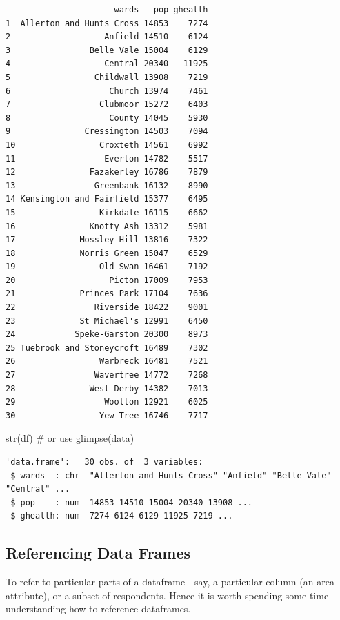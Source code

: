 \documentclass[
  letterpaper,
  DIV=11,
  numbers=noendperiod,
  oneside]{scrreprt}
\newenvironment{Shaded}{\begin{snugshade}}{\end{snugshade}}
\newcommand{\CommentTok}[1]{\textcolor[rgb]{0.37,0.37,0.37}{#1}}
\newcommand{\FunctionTok}[1]{\textcolor[rgb]{0.28,0.35,0.67}{#1}}
\newcommand{\NormalTok}[1]{\textcolor[rgb]{0.00,0.23,0.31}{#1}}
\begin{document}
\begin{verbatim}
                      wards   pop ghealth
1  Allerton and Hunts Cross 14853    7274
2                   Anfield 14510    6124
3                Belle Vale 15004    6129
4                   Central 20340   11925
5                 Childwall 13908    7219
6                    Church 13974    7461
7                  Clubmoor 15272    6403
8                    County 14045    5930
9               Cressington 14503    7094
10                 Croxteth 14561    6992
11                  Everton 14782    5517
12               Fazakerley 16786    7879
13                Greenbank 16132    8990
14 Kensington and Fairfield 15377    6495
15                 Kirkdale 16115    6662
16               Knotty Ash 13312    5981
17             Mossley Hill 13816    7322
18             Norris Green 15047    6529
19                 Old Swan 16461    7192
20                   Picton 17009    7953
21             Princes Park 17104    7636
22                Riverside 18422    9001
23             St Michael's 12991    6450
24            Speke-Garston 20300    8973
25 Tuebrook and Stoneycroft 16489    7302
26                 Warbreck 16481    7521
27                Wavertree 14772    7268
28               West Derby 14382    7013
29                  Woolton 12921    6025
30                 Yew Tree 16746    7717
\end{verbatim}

\begin{Shaded}
\begin{Highlighting}[]
\FunctionTok{str}\NormalTok{(df) }\CommentTok{\# or use glimpse(data) }
\end{Highlighting}
\end{Shaded}

\begin{verbatim}
'data.frame':   30 obs. of  3 variables:
 $ wards  : chr  "Allerton and Hunts Cross" "Anfield" "Belle Vale" "Central" ...
 $ pop    : num  14853 14510 15004 20340 13908 ...
 $ ghealth: num  7274 6124 6129 11925 7219 ...
\end{verbatim}

\subsection{Referencing Data Frames}\label{referencing-data-frames}

To refer to particular parts of a dataframe - say, a particular column
(an area attribute), or a subset of respondents. Hence it is worth
spending some time understanding how to reference dataframes.
\end{document}
